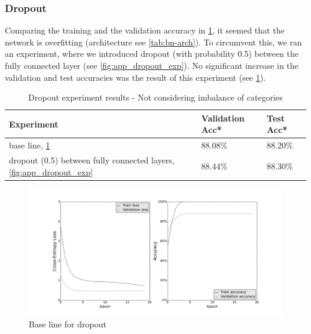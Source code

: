 \documentclass[a4paper, 11pt]{article}
\begin{document}
\subsubsection{Dropout}
Comparing the training and the validation accuracy in \cref{fig:app_dropout_base}, it seemed that the network is overfitting (architecture see \cref{tab:bn-arch}).
To circumvent this, we ran an experiment, where we introduced dropout (with probability 0.5) between the fully connected layer (see \cref{fig:app_dropout_exp}).
No significant increase in the validation and test accuracies was the result of this experiment (see \cref{tab:app_dropout_experiment-results}).
\begin{table}[!h]
	\begin{center}
		\begin{tabularx}{\linewidth}{|X|l|l|}
			\hline \textbf{Experiment} & \textbf{Validation Acc*} & \textbf{Test Acc*}\\ 
			\hline base line, \cref{fig:app_dropout_base} & 88.08\% & 88.20\% \\
			\hline dropout (0.5) between fully connected layers, \cref{fig:app_dropout_exp} & 88.44\% & 88.30\% \\
			\hline
		\end{tabularx}
	\end{center}
	\caption{Dropout experiment results - Not considering imbalance of categories}
	\label{tab:app_dropout_experiment-results}
\end{table}
\begin{figure}[H]
	\includegraphics[width=\linewidth]{appendix-bn_triangular_e20.png}
	\caption{Base line for dropout}
	\label{fig:app_dropout_base}
\end{figure}
\end{document}
